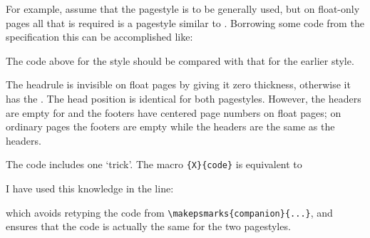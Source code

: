     For example, assume that the  pagestyle is to be
generally used, but on float-only pages all that is required is a pagestyle
similar to . Borrowing some code from the 
specification this can be accomplished like:
\begin{lcode}
%
  {\ifonlyfloats{0pt}{\normalrulethickness}}
%
             {\ifonlyfloats{}{\normalfont\bfseries\thepage}}%
             {}%
             {\ifonlyfloats{}{\normalfont\bfseries\leftmark}}
%
             {\ifonlyfloats{}{\normalfont\bfseries\rightmark}}%
             {}%
             {\ifonlyfloats{}{\normalfont\bfseries\thepage}}
\end{lcode}
The code above for the  style should be compared with 
that for the earlier  style.

    The headrule is invisible 
on float pages by giving it zero thickness, 
otherwise it has the \cmd{\normalrulethickness}. The head position is 
identical for both pagestyles. However, the headers are empty for
 and the footers have centered page numbers 
on float pages; on ordinary pages the footers are empty 
while the headers
are the same as the  headers.

    The code includes one `trick'. The macro \cmd{\makepsmarks}\verb?{X}{code}?
is equivalent to
\begin{lcode}
\newcommand{\Xpshook}{code}
\end{lcode}
I have used this knowledge in the line:
\begin{lcode}
\end{lcode}
which avoids retyping the code from 
\verb?\makepsmarks{companion}{...}?,
and ensures that the code is actually the same for the two pagestyles.

